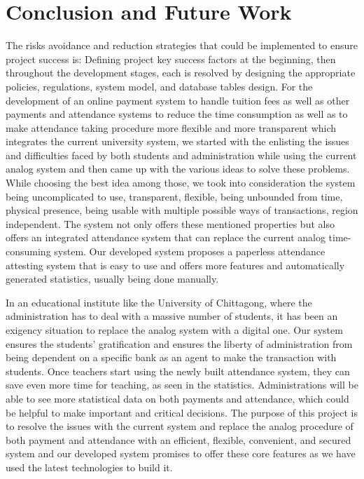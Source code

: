 \section{Conclusion and Future Work}\label{sec:cfw}
The risks avoidance and reduction strategies that could be implemented to ensure project success is: Defining project key success factors at the beginning, then throughout the development stages, each is resolved by designing the appropriate policies, regulations, system model, and database tables design. For the development of an online payment system to handle tuition fees as well as other payments and attendance systems to reduce the time consumption as well as to make attendance taking procedure more flexible and more transparent which integrates the current university system, we started with the enlisting the issues and difficulties faced by both students and administration while using the current analog system and then came up with the various ideas to solve these problems. While choosing the best idea among those, we took into consideration the system being uncomplicated to use, transparent, flexible, being unbounded from time, physical presence, being usable with multiple possible ways of transactions, region independent. The system not only offers these mentioned properties but also offers an integrated attendance system that can replace the current analog time-consuming system. Our developed system proposes a paperless attendance attesting system that is easy to use and offers more features and automatically generated statistics, usually being done manually.

In an educational institute like the University of Chittagong, where the administration has to deal with a massive number of students, it has been an exigency situation to replace the analog system with a digital one. Our system ensures the students' gratification and ensures the liberty of administration from being dependent on a specific bank as an agent to make the transaction with students. Once teachers start using the newly built attendance system, they can save even more time for teaching, as seen in the statistics. Administrations will be able to see more statistical data on both payments and attendance, which could be helpful to make important and critical decisions. The purpose of this project is to resolve the issues with the current system and replace the analog procedure of both payment and attendance with an efficient, flexible, convenient, and secured system and our developed system promises to offer these core features as we have used the latest technologies to build it.

